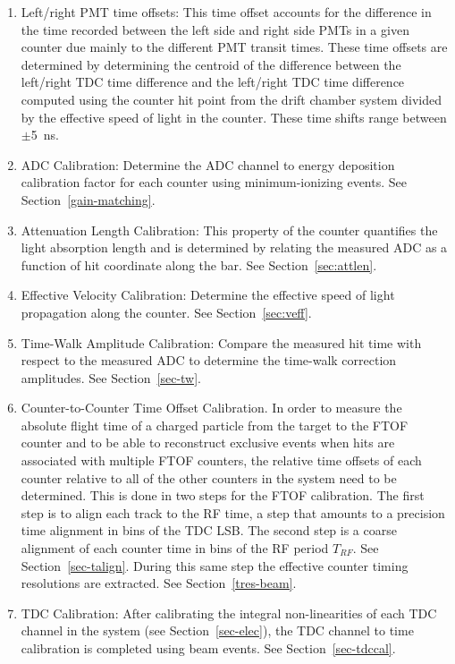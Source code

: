 \documentclass{elsart}
\begin{document}
\begin{enumerate}
\item Left/right PMT time offsets: This time offset accounts for the difference in the time recorded
between the left side and right side PMTs in a given counter due mainly to the different PMT transit times.
These time offsets are determined by determining the centroid of the difference between the left/right
TDC time difference and the left/right TDC time difference computed using the counter hit point from the
drift chamber system divided by the effective speed of light in the counter. These time shifts range between
$\pm$5~ns.

\item ADC Calibration: Determine the ADC channel to energy deposition calibration factor for each counter
using minimum-ionizing events. See Section~\ref{gain-matching}.

\item Attenuation Length Calibration: This property of the counter quantifies the light absorption length and
is determined by relating the measured ADC as a function of hit coordinate along the bar. See
Section~\ref{sec:attlen}.

\item Effective Velocity Calibration: Determine the effective speed of light propagation along the counter. See
Section~\ref{sec:veff}.

\item Time-Walk Amplitude Calibration: Compare the measured hit time with respect to the measured ADC to
determine the time-walk correction amplitudes. See Section~\ref{sec-tw}.
  
\item Counter-to-Counter Time Offset Calibration. In order to measure the absolute flight time of a charged
particle from the target to the FTOF counter and to be able to reconstruct exclusive events when hits are
associated with multiple FTOF counters, the relative time offsets of each counter relative to all of the other
counters in the system need to be determined. This is done in two steps for the FTOF calibration. The first
step is to align each track to the RF time, a step that amounts to a precision time alignment in bins of the TDC
LSB. The second step is a coarse alignment of each counter time in bins of the RF period $T_{RF}$. See
Section~\ref{sec-talign}. During this same step the effective counter timing resolutions are extracted. See
Section~\ref{tres-beam}.

\item TDC Calibration: After calibrating the integral non-linearities of each TDC channel in the system (see
Section~\ref{sec-elec}), the TDC channel to time calibration is completed using beam events. See
Section~\ref{sec-tdccal}.

\end{enumerate}
\end{document}
